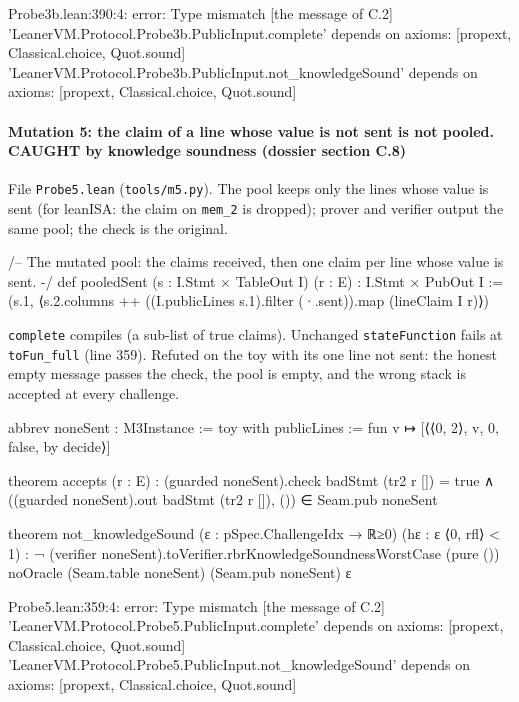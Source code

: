\begin{srccode}
Probe3b.lean:390:4: error: Type mismatch   [the message of C.2]
'LeanerVM.Protocol.Probe3b.PublicInput.complete' depends on axioms: [propext, Classical.choice, Quot.sound]
'LeanerVM.Protocol.Probe3b.PublicInput.not_knowledgeSound' depends on axioms: [propext, Classical.choice, Quot.sound]
\end{srccode}

\paragraph{Mutation 5: the claim of a line whose value is not sent is not pooled. CAUGHT by knowledge soundness (dossier section C.8)}\label{sec:gen-pubinput-C8}

File \texttt{Probe5.\allowbreak{}lean} (\texttt{tools/\allowbreak{}m5.\allowbreak{}py}). The pool keeps only the lines whose value is sent (for leanISA: the claim on \texttt{mem\_\allowbreak{}2} is dropped); prover and verifier output the same pool; the check is the original.

\begin{leancode}
/-- The mutated pool: the claims received, then one claim per line whose value is sent. -/
def pooledSent (s : I.Stmt × TableOut I) (r : E) : I.Stmt × PubOut I :=
  (s.1, ⟨s.2.columns ++ ((I.publicLines s.1).filter (·.sent)).map (lineClaim I r)⟩)
\end{leancode}

\texttt{complete} compiles (a sub-list of true claims). Unchanged \texttt{stateFunction} fails at \texttt{toFun\_\allowbreak{}full} (line 359). Refuted on the toy with its one line not sent: the honest empty message passes the check, the pool is empty, and the wrong stack is accepted at every challenge.

\begin{leancode}
abbrev noneSent : M3Instance :=
  { toy with publicLines := fun v ↦ [⟨⟨0, 2⟩, v, 0, false, by decide⟩] }

theorem accepts (r : E) :
    (guarded noneSent).check badStmt (tr2 r []) = true ∧
      ((guarded noneSent).out badStmt (tr2 r []), ()) ∈ Seam.pub noneSent

theorem not_knowledgeSound (ε : pSpec.ChallengeIdx → ℝ≥0) (hε : ε ⟨0, rfl⟩ < 1) :
    ¬ (verifier noneSent).toVerifier.rbrKnowledgeSoundnessWorstCase (pure ()) noOracle
      (Seam.table noneSent) (Seam.pub noneSent) ε
\end{leancode}

\begin{srccode}
Probe5.lean:359:4: error: Type mismatch   [the message of C.2]
'LeanerVM.Protocol.Probe5.PublicInput.complete' depends on axioms: [propext, Classical.choice, Quot.sound]
'LeanerVM.Protocol.Probe5.PublicInput.not_knowledgeSound' depends on axioms: [propext, Classical.choice, Quot.sound]
\end{srccode}

